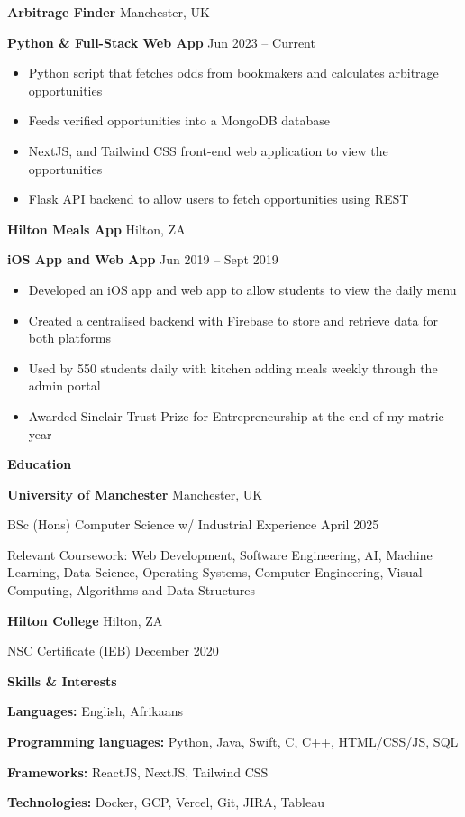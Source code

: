 \documentclass[11pt]{article}
\begin{document}
\textbf{Arbitrage Finder} \hfill Manchester, UK

\textbf{Python \& Full-Stack Web App} \hfill Jun 2023 – Current
\begin{itemize}[noitemsep, topsep=0pt, partopsep=0pt, parsep=0pt]
    \item Python script that fetches odds from bookmakers and calculates arbitrage opportunities
    \item Feeds verified opportunities into a MongoDB database
    \item NextJS, and Tailwind CSS front-end web application to view the opportunities
    \item Flask API backend to allow users to fetch opportunities using REST
\end{itemize}

\vspace{12pt}

\textbf{Hilton Meals App} \hfill Hilton, ZA

\textbf{iOS App and Web App} \hfill Jun 2019 – Sept 2019
\begin{itemize}[noitemsep, topsep=0pt, partopsep=0pt, parsep=0pt]
    \item Developed an iOS app and web app to allow students to view the daily menu
    \item Created a centralised backend with Firebase to store and retrieve data for both platforms
    \item Used by 550 students daily with kitchen adding meals weekly through the admin portal
    \item Awarded Sinclair Trust Prize for Entrepreneurship at the end of my matric year
\end{itemize}

\vspace{12pt}

\begin{center}
    \textbf{Education}
\end{center}
\textbf{University of Manchester} \hfill Manchester, UK

BSc (Hons) Computer Science w/ Industrial Experience \hfill April 2025

Relevant Coursework: Web Development, Software Engineering, AI, Machine Learning, Data Science, Operating Systems, Computer Engineering, Visual Computing, Algorithms and Data Structures

\vspace{12pt}

\textbf{Hilton College} \hfill	Hilton, ZA

NSC Certificate (IEB) \hfill December 2020

\vspace{12pt}

\begin{center}
    \textbf{Skills \& Interests}
\end{center}

\textbf{Languages:} English, Afrikaans

\textbf{Programming languages:} Python, Java, Swift, C, C++, HTML/CSS/JS, SQL

\textbf{Frameworks:} ReactJS, NextJS, Tailwind CSS

\textbf{Technologies:} Docker, GCP, Vercel, Git, JIRA, Tableau
\end{document}
